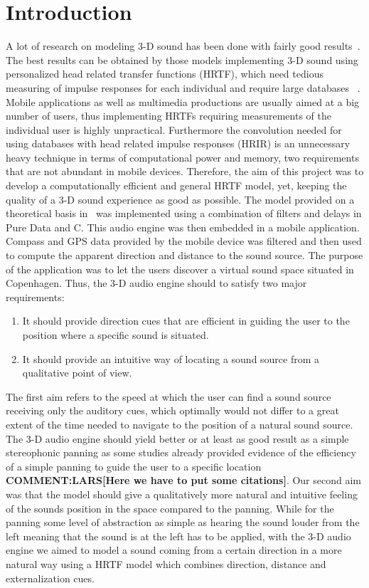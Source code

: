 \documentclass[journal]{IEEEtran}
\begin{document}
\section{Introduction}
A lot of research on modeling 3-D sound has been done with fairly good results~\cite{begault19943}. The best results can be obtained by those models implementing 3-D sound using personalized head related transfer functions (HRTF), which need tedious measuring of impulse responses for each individual and require large databases ~\cite{SpatialAudio2007, Meshram2014}. Mobile applications as well as multimedia productions are usually aimed at a big number of users, thus implementing HRTFs requiring measurements of the individual user is highly unpractical. Furthermore the convolution needed for using databases with head related impulse responses (HRIR) is an unnecessary heavy technique in terms of computational power and memory, two requirements that are not abundant in mobile devices. Therefore, the aim of this project was to develop a computationally efficient and general HRTF model, yet, keeping the quality of a 3-D sound experience as good as possible. The model provided on a theoretical basis in~\cite{Brown1997} was implemented using a combination of filters and delays in Pure Data and C. This audio engine was then embedded in a mobile application. Compass and GPS data provided by the mobile device was filtered and then used to compute the apparent direction and distance to the sound source. The purpose of the application was to let the users discover a virtual sound space situated in Copenhagen. Thus, the 3-D audio engine should to satisfy two major requirements:
\begin{enumerate}
    \item It should provide direction cues that are efficient in guiding the user to the position where a specific sound is situated.
    \item It should provide an intuitive way of locating a sound source from a qualitative point of view.
\end{enumerate}

The first aim refers to the speed at which the user can find a sound source receiving only the auditory cues, which optimally would not differ to a great extent of the time needed to navigate to the position of a natural sound source. The 3-D audio engine should yield better or at least as good result as a simple stereophonic panning as some studies already provided evidence of the efficiency of a simple panning to guide the user to a specific location\textbf{ COMMENT:LARS[Here we have to put some citations]\cite{}}. Our second aim was that the model should give a qualitatively more natural and intuitive feeling of the sounds position in the space compared to the panning. While for the panning some level of abstraction as simple as hearing the sound louder from the left meaning that the sound is at the left has to be applied, with the 3-D audio engine we aimed to model a sound coming from a certain direction in a more natural way using a HRTF model which combines direction, distance and externalization cues.
\end{document}

